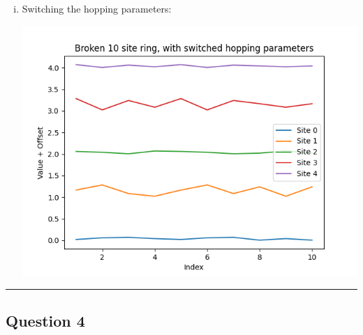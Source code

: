 \documentclass[11pt]{article}
\begin{document}
\begin{enumerate}[(i).]
  \item Switching the hopping parameters:
  \begin{center}
    \includegraphics*[scale=0.7]{plots/Q3part3.png}
  \end{center}
\end{enumerate}

\vskip 1cm
\hrule
\vskip 1cm


\subsection*{Question 4}
\end{document}
